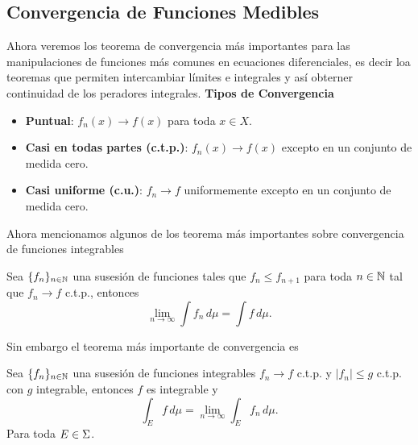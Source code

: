 \documentclass[main.tex]{subfiles}
\begin{document}
\subsection{Convergencia de Funciones Medibles}
\noindent Ahora veremos los teorema de convergencia más importantes para las manipulaciones de funciones más comunes en ecuaciones diferenciales, es decir loa teoremas que permiten intercambiar límites e integrales y así obterner continuidad de los peradores integrales.
\noindent\textbf{Tipos de Convergencia}
\begin{itemize}
    \item \textbf{Puntual}: $f_n(x) \to f(x)$ para toda $x\in X$.
    \item \textbf{Casi en todas partes (c.t.p.)}: $f_n(x) \to f(x)$ excepto en un conjunto de medida cero.
    \item \textbf{Casi uniforme (c.u.)}: $f_n \to f$ uniformemente excepto en un conjunto de medida cero.
\end{itemize}
Ahora mencionamos algunos de los teorema más importantes sobre convergencia de funciones integrables
\begin{teorema}
  Sea $\{f_n\}_{n\in \mathbb N }$ una susesión de funciones tales que $f_n \leq f_{n+1}$ para toda $n\in \mathbb N $ tal que $f_n\to f$ c.t.p., entonces
\[
  \lim_{n \to \infty} \int f_n \, d\mu = \int f \, d\mu.
  \]
  \end{teorema}
Sin embargo el teorema más importante de convergencia es
\begin{teorema}
Sea $\{f_n\}_{n\in \mathbb N }$ una susesión de funciones integrables $f_n \to f$ c.t.p. y $|f_n| \leq g$ c.t.p. con $g$ integrable, entonces $f$ es integrable y
\[
 \int_E f \, d\mu=\lim_{n \to \infty} \int_E f_n \, d\mu.
\]
\noindent Para toda $E\in\Sigma$.
\end{teorema}
\end{document}
